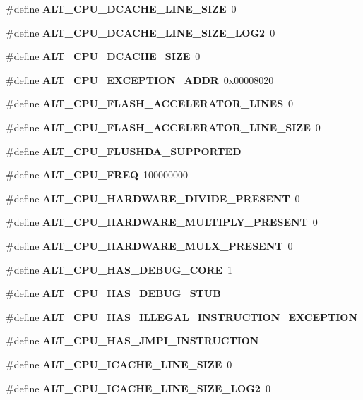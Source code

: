\begin{DoxyCompactItemize}
\item 
\#define {\bf A\+L\+T\+\_\+\+C\+P\+U\+\_\+\+D\+C\+A\+C\+H\+E\+\_\+\+L\+I\+N\+E\+\_\+\+S\+I\+ZE}~0
\item 
\#define {\bf A\+L\+T\+\_\+\+C\+P\+U\+\_\+\+D\+C\+A\+C\+H\+E\+\_\+\+L\+I\+N\+E\+\_\+\+S\+I\+Z\+E\+\_\+\+L\+O\+G2}~0
\item 
\#define {\bf A\+L\+T\+\_\+\+C\+P\+U\+\_\+\+D\+C\+A\+C\+H\+E\+\_\+\+S\+I\+ZE}~0
\item 
\#define {\bf A\+L\+T\+\_\+\+C\+P\+U\+\_\+\+E\+X\+C\+E\+P\+T\+I\+O\+N\+\_\+\+A\+D\+DR}~0x00008020
\item 
\#define {\bf A\+L\+T\+\_\+\+C\+P\+U\+\_\+\+F\+L\+A\+S\+H\+\_\+\+A\+C\+C\+E\+L\+E\+R\+A\+T\+O\+R\+\_\+\+L\+I\+N\+ES}~0
\item 
\#define {\bf A\+L\+T\+\_\+\+C\+P\+U\+\_\+\+F\+L\+A\+S\+H\+\_\+\+A\+C\+C\+E\+L\+E\+R\+A\+T\+O\+R\+\_\+\+L\+I\+N\+E\+\_\+\+S\+I\+ZE}~0
\item 
\#define {\bf A\+L\+T\+\_\+\+C\+P\+U\+\_\+\+F\+L\+U\+S\+H\+D\+A\+\_\+\+S\+U\+P\+P\+O\+R\+T\+ED}
\item 
\#define {\bf A\+L\+T\+\_\+\+C\+P\+U\+\_\+\+F\+R\+EQ}~100000000
\item 
\#define {\bf A\+L\+T\+\_\+\+C\+P\+U\+\_\+\+H\+A\+R\+D\+W\+A\+R\+E\+\_\+\+D\+I\+V\+I\+D\+E\+\_\+\+P\+R\+E\+S\+E\+NT}~0
\item 
\#define {\bf A\+L\+T\+\_\+\+C\+P\+U\+\_\+\+H\+A\+R\+D\+W\+A\+R\+E\+\_\+\+M\+U\+L\+T\+I\+P\+L\+Y\+\_\+\+P\+R\+E\+S\+E\+NT}~0
\item 
\#define {\bf A\+L\+T\+\_\+\+C\+P\+U\+\_\+\+H\+A\+R\+D\+W\+A\+R\+E\+\_\+\+M\+U\+L\+X\+\_\+\+P\+R\+E\+S\+E\+NT}~0
\item 
\#define {\bf A\+L\+T\+\_\+\+C\+P\+U\+\_\+\+H\+A\+S\+\_\+\+D\+E\+B\+U\+G\+\_\+\+C\+O\+RE}~1
\item 
\#define {\bf A\+L\+T\+\_\+\+C\+P\+U\+\_\+\+H\+A\+S\+\_\+\+D\+E\+B\+U\+G\+\_\+\+S\+T\+UB}
\item 
\#define {\bf A\+L\+T\+\_\+\+C\+P\+U\+\_\+\+H\+A\+S\+\_\+\+I\+L\+L\+E\+G\+A\+L\+\_\+\+I\+N\+S\+T\+R\+U\+C\+T\+I\+O\+N\+\_\+\+E\+X\+C\+E\+P\+T\+I\+ON}
\item 
\#define {\bf A\+L\+T\+\_\+\+C\+P\+U\+\_\+\+H\+A\+S\+\_\+\+J\+M\+P\+I\+\_\+\+I\+N\+S\+T\+R\+U\+C\+T\+I\+ON}
\item 
\#define {\bf A\+L\+T\+\_\+\+C\+P\+U\+\_\+\+I\+C\+A\+C\+H\+E\+\_\+\+L\+I\+N\+E\+\_\+\+S\+I\+ZE}~0
\item 
\#define {\bf A\+L\+T\+\_\+\+C\+P\+U\+\_\+\+I\+C\+A\+C\+H\+E\+\_\+\+L\+I\+N\+E\+\_\+\+S\+I\+Z\+E\+\_\+\+L\+O\+G2}~0

\end{DoxyCompactItemize}
